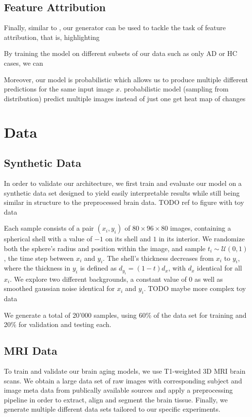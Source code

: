 \section{Feature Attribution}
Finally, similar to \cite{VAGAN}, our generator can be used to tackle the task of feature attribution, that is, highlighting 

By training the model on different subsets of our data such as only AD or HC cases, we can 

Moreover, our model is probabilistic which allows us to produce multiple different predictions for the same input image $x$.
probabilistic model (sampling from distribution)
predict multiple images instead of just one
get heat map of changes

\chapter{Data}

\section{Synthetic Data} \label{sec:synth}
In order to validate our architecture, we first train and evaluate our model on a synthetic data set designed to yield easily interpretable results while still being similar in structure to the preprocessed brain data. TODO ref to figure with toy data

Each sample consists of a pair $(x_i, y_i)$ of $ 80 \times 96 \times 80 $ images, containing a spherical shell with a value of $-1$ on its shell and $1$ in its interior. We randomize both the sphere's radius and position within the image, and sample $t_i \sim \mathcal{U}(0, 1)$, the time step between $x_i$ and $y_i$. The shell's thickness decreases from $x_i$ to $y_i$, where the thickness in $y_i$ is defined as $d_{y_i} = (1-t) d_x$, with $d_x$ identical for all $x_i$. We explore two different backgrounds, a constant value of 0 as well as smoothed gaussian noise identical for $x_i$ and $y_i$. TODO maybe more complex toy data

We generate a total of 20'000 samples, using 60\% of the data set for training and 20\% for validation and testing each.

\section{MRI Data}
To train and validate our brain aging models, we use T1-weighted 3D MRI brain scans. We obtain a large data set of raw images with corresponding subject and image meta data from publically available sources and apply a preprocessing pipeline in order to extract, align and segment the brain tissue. Finally, we generate multiple different data sets tailored to our specific experiments.

